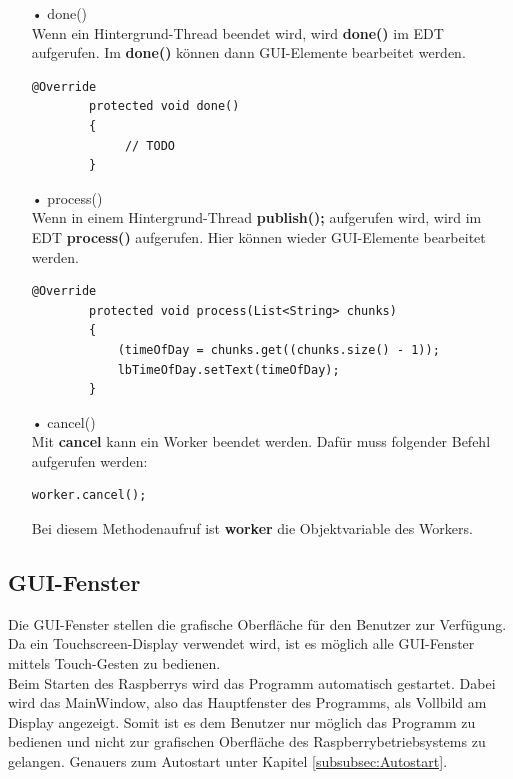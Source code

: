 \begin{itemize}
\item[•] done()
\\ Wenn ein Hintergrund-Thread beendet wird, wird \textbf{done()} im EDT aufgerufen. Im \textbf{done()} können dann GUI-Elemente bearbeitet werden.
\begin{lstlisting}[style=JavaStyle, caption=SwingWorker done()]
	    @Override
        protected void done()
        {
             // TODO
        }
\end{lstlisting}
\item[•] process()
\\ Wenn in einem Hintergrund-Thread \textbf{publish();} aufgerufen wird, wird im EDT \textbf{process()} aufgerufen. Hier können wieder GUI-Elemente bearbeitet werden.
\begin{lstlisting}[style=JavaStyle, caption=SwingWorker process()]
	    @Override
        protected void process(List<String> chunks)
        {
        	(timeOfDay = chunks.get((chunks.size() - 1));
            lbTimeOfDay.setText(timeOfDay);
        }
\end{lstlisting}
\item[•] cancel()
\\ Mit \textbf{cancel} kann ein Worker beendet werden. Dafür muss folgender Befehl aufgerufen werden:
\begin{lstlisting}[style=JavaStyle, caption=SwingWorker abbrechen]
	    worker.cancel();
\end{lstlisting}
Bei diesem Methodenaufruf ist \textbf{worker} die Objektvariable des Workers.
\end{itemize}

\subsection{GUI-Fenster}
Die GUI-Fenster stellen die grafische Oberfläche für den Benutzer zur Verfügung. Da ein Touchscreen-Display verwendet wird, ist es möglich alle GUI-Fenster mittels Touch-Gesten zu bedienen. 
\\ Beim Starten des Raspberrys wird das Programm automatisch gestartet. Dabei wird das MainWindow, also das Hauptfenster des Programms, als Vollbild am Display angezeigt. Somit ist es dem Benutzer nur möglich das Programm zu bedienen und nicht zur grafischen Oberfläche des Raspberrybetriebsystems zu gelangen. Genauers zum Autostart unter Kapitel \ref{subsubsec:Autostart}.

